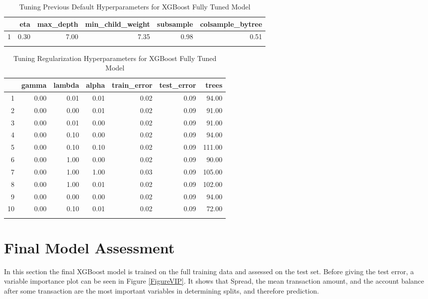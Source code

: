 \documentclass[11pt,preprint, authoryear]{elsarticle}
\numberwithin{equation}{section}
\numberwithin{figure}{section}
\numberwithin{table}{section}
\begin{document}
\begin{longtable}{rrrrrr}
  \hline
 & eta & max\_depth & min\_child\_weight & subsample & colsample\_bytree \\ 
  \hline
1 & 0.30 & 7.00 & 7.35 & 0.98 & 0.51 \\ 
   \hline
\hline
\caption{Tuning Previous Default Hyperparameters for XGBoost Fully Tuned Model \label{XGBTune2Table}} 
\end{longtable}

\newpage
\begin{longtable}{rrrrrrr}
  \hline
 & gamma & lambda & alpha & train\_error & test\_error & trees \\ 
  \hline
1 & 0.00 & 0.01 & 0.01 & 0.02 & 0.09 & 94.00 \\ 
  2 & 0.00 & 0.00 & 0.01 & 0.02 & 0.09 & 91.00 \\ 
  3 & 0.00 & 0.01 & 0.00 & 0.02 & 0.09 & 91.00 \\ 
  4 & 0.00 & 0.10 & 0.00 & 0.02 & 0.09 & 94.00 \\ 
  5 & 0.00 & 0.10 & 0.10 & 0.02 & 0.09 & 111.00 \\ 
  6 & 0.00 & 1.00 & 0.00 & 0.02 & 0.09 & 90.00 \\ 
  7 & 0.00 & 1.00 & 1.00 & 0.03 & 0.09 & 105.00 \\ 
  8 & 0.00 & 1.00 & 0.01 & 0.02 & 0.09 & 102.00 \\ 
  9 & 0.00 & 0.00 & 0.00 & 0.02 & 0.09 & 94.00 \\ 
  10 & 0.00 & 0.10 & 0.01 & 0.02 & 0.09 & 72.00 \\ 
   \hline
\hline
\caption{Tuning Regularization Hyperparameters for XGBoost Fully Tuned Model \label{XGBTune2Table_b}} 
\end{longtable}

\hypertarget{final-model-assessment}{%
\section{Final Model Assessment}\label{final-model-assessment}}

In this section the final XGBoost model is trained on the full training
data and assessed on the test set. Before giving the test error, a
variable importance plot can be seen in Figure \ref{FigureVIP}. It shows
that Spread, the mean transaction amount, and the account balance after
some transaction are the most important variables in determining splits,
and therefore prediction.
\end{document}
